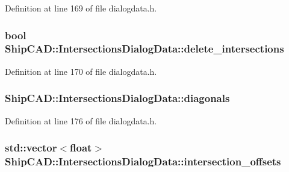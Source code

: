Definition at line 169 of file dialogdata.\+h.

\subsubsection[{\texorpdfstring{delete\+\_\+intersections}{delete_intersections}}]{\setlength{\rightskip}{0pt plus 5cm}bool Ship\+C\+A\+D\+::\+Intersections\+Dialog\+Data\+::delete\+\_\+intersections}\hypertarget{structShipCAD_1_1IntersectionsDialogData_a0b612a856d1875fb0062907fb1cc77a7}{}\label{structShipCAD_1_1IntersectionsDialogData_a0b612a856d1875fb0062907fb1cc77a7}


Definition at line 170 of file dialogdata.\+h.

\subsubsection[{\texorpdfstring{diagonals}{diagonals}}]{ Ship\+C\+A\+D\+::\+Intersections\+Dialog\+Data\+::diagonals}\hypertarget{structShipCAD_1_1IntersectionsDialogData_aa646939995a2b52262724964a6e1fd47}{}\label{structShipCAD_1_1IntersectionsDialogData_aa646939995a2b52262724964a6e1fd47}


Definition at line 176 of file dialogdata.\+h.

\subsubsection[{\texorpdfstring{intersection\+\_\+offsets}{intersection_offsets}}]{\setlength{\rightskip}{0pt plus 5cm}std\+::vector$<$float$>$ Ship\+C\+A\+D\+::\+Intersections\+Dialog\+Data\+::intersection\+\_\+offsets}\hypertarget{structShipCAD_1_1IntersectionsDialogData_ac2a5677d64845ff41b99f05f590170f8}{}\label{structShipCAD_1_1IntersectionsDialogData_ac2a5677d64845ff41b99f05f590170f8}


